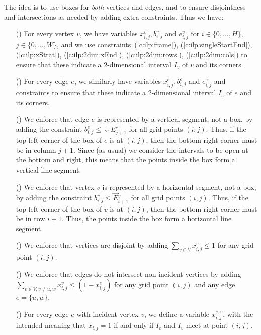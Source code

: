 \documentclass[runningheads]{llncs}
\newcommand{\rowsum}[1]{{\overset{\rightarrow}{#1}}}
\newcommand{\columnsum}[1]{{\downarrow\!#1}}
\newcounter{constr}
\newcommand{\constr}[1]{\noindent \refstepcounter{constr}\theconstr #1}
\begin{document}
The idea is to use boxes for {\em both} vertices
and edges, and to ensure disjointness and intersections as needed
by adding extra constraints.
Thus we have:
\begin{itemize}
\item[(\constr{\label{c:vis:vert}})] For every vertex $v$, we have variables $x_{i,j}^v,b_{i,j}^v$ and
	$e_{i,j}^v$ for $i\in \{0,\dots,H\}$, $j\in \{0,\dots,W\}$,
	and we use constraints~(\ref{c:ilp:frame}),
	(\ref{c:ilp:singleStartEnd}), (\ref{c:ilp:xStrat}),
	(\ref{c:ilp:2dim:xEnd}), (\ref{c:ilp:2dim:rows}), (\ref{c:ilp:2dim:cols})
	 to ensure that these
	indicate a 2-dimensional interval $I_v$ of $v$ and its corners.
\item[(\constr{\label{c:vis:edges}})] For every edge $e$, we similarly have variables $x_{i,j}^e,b_{i,j}^e$ and
	$e_{i,j}^e$ and constraints
to ensure that these
	indicate a 2-dimensional interval $I_e$ of $e$ and its corners.
\item[(\constr{\label{c:vis:eVert}})]
	We enforce that edge $e$ is represented by a vertical segment, not a box,
	by adding the constraint 
$b_{i,j}^e \leq \columnsum{E}{_{j+1}^e}$
	for all grid points $(i,j)$.
	Thus, if the top left corner of the box of $e$ is at $(i,j)$,
	then the bottom right corner must be in column $j+1$. 
	Since (as usual) we consider the intervals to be
	open at the bottom and right, this means that the points
	inside the box form a vertical line segment.
\item[(\constr{\label{c:vis:vHor}})]
	We enforce that vertex $v$ is represented by a horizontal segment, not a box,
	by adding the constraint 
$b_{i,j}^v \leq \rowsum{E}{_{i+1}^v}$
	for all grid points $(i,j)$.
	Thus, if the top left corner of the box of $v$ is at $(i,j)$,
	then the bottom right corner must be in row $i+1$.
	Thus, the points inside the box form a horizontal line segment.
\item[(\constr{\label{c:vis:vDisj}})]
	We enforce that vertices are disjoint by adding
	$\sum_{v\in V} x_{i,j}^v \leq 1$ for any grid point $(i,j)$.
\item[(\constr{\label{c:vis:evNonAdj}})]
 	We enforce that edges do not intersect non-incident vertices
	by adding\\ $\sum_{v\in V, v\neq u,w} x_{i,j}^v \leq (1-x_{i,j}^e)$ 
	for any grid point $(i,j)$ and any edge $e=\{ u,w \}$.		 	
\item[(\constr{\label{c:vis:evAdj}})]
	For every edge $e$ with incident vertex $v$, we define a
	variable $x_{i,j}^{e,v}$, with the intended meaning that
	$x_{i,j}=1$ if and only if $I_e$ and $I_v$ meet at point $(i,j)$.

\end{itemize}
\end{document}
